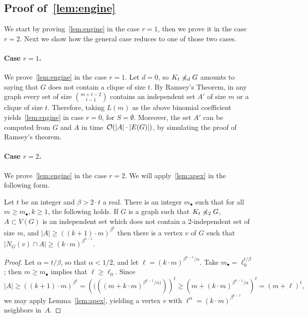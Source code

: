\subsection{Proof of~\cref{lem:engine}}
\label{sec:engine}

We start by proving~\cref{lem:engine} in the case $r=1$,
then we prove it in the case $r=2$. Next we show how the general case reduces to one of those two cases.

\paragraph{Case $r=1$.}
We prove~\cref{lem:engine} in the case $r=1$.
Let $d=0$, so $K_t\not\preccurlyeq_d G$ amounts to saying that $G$
does not contain a clique of size $t$. By Ramsey's Theorem, in any graph every set of size $\binom{m+t-2}{t-1}$ contains an
independent set $A'$ of size $m$ or a clique of size $t$. Therefore, 
taking $L(m)$ as the above binomial coefficient yields~\cref{lem:engine} in case $r=0$, for $S=\emptyset$. Moreover, the set $A'$ can be computed from $G$ and $A$
in time~$\mathcal{O}(|A|\cdot |E(G)|)$, by simulating the proof of Ramsey's theorem.

\paragraph{Case $r=2$.}
We prove~\cref{lem:engine} in the case $r=2$. 
We will apply~\cref{lem:apex} in the following form.
\begin{corollary}\label{cor:apex}
	Let $t$ be an integer and $\beta>2\cdot t$ a real. 
	There is an integer $m_\bullet$ such that for all $m\ge m_\bullet,k\ge 1$, the following holds.
	If $G$ is a graph such that $K_t\not\preccurlyeq_2 G$,
	$A\subset V(G)$ is an independent set which does not contain a $2$-independent set of size $m$, and $|A|\ge ((k+1)\cdot m)^{\beta ^k}$
	then there is a vertex $v$ of $G$ such that $|N_G(v)\cap A| \ge (k\cdot m)^{\beta^{k-1}}$.
\end{corollary}
\begin{proof}
Let $\alpha=t/\beta$, so that $\alpha<1/2$, 
 and let 
$\ell=(k\cdot m)^{\beta^{k-1}/\alpha}$.
Take $m_\bullet= \ell_0^{t/\beta}$; then $m\ge m_\bullet$ implies that $\ell\ge\ell_0$.
Since
$$|A|\ge \left((k+1)\cdot m\right)^{\beta^k}=\left ((((m+ k\cdot m)^{\beta^{k-1}/\alpha)}) \right)^t
\ge (m+(k\cdot m)^{\beta^{k-1}/\alpha})^t=(m+\ell)^t,$$
we may  apply Lemma~\ref{lem:apex},
yielding a vertex $v$ with $\ell^\alpha=(k\cdot m)^{\beta^{k-1}}$ neighbors in~$A$.
\end{proof}


